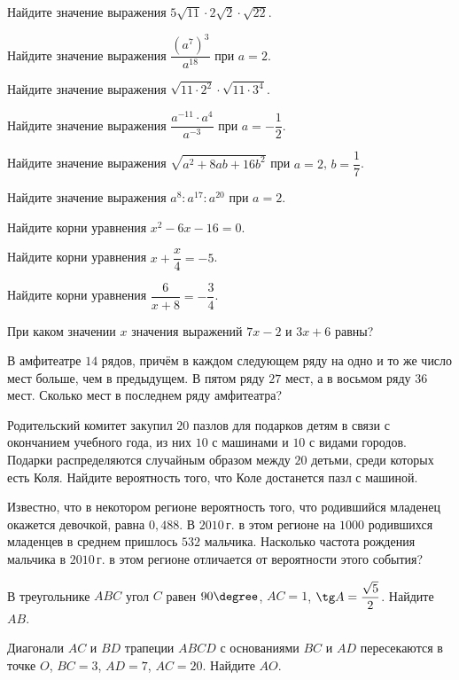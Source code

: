 \begin{class}[number=7]
	\begin{listofex}
		\item  Найдите значение выражения \( 5\sqrt{11}\cdot2\sqrt{2}\cdot\sqrt{22}\).
		\item  Найдите значение выражения \( \dfrac{(a^{7})^{3}}{a^{18}}\) при \( a=2 \).
		\item  Найдите значение выражения \( \sqrt{11\cdot2^{2}}\cdot\sqrt{11\cdot3^{4}}\).
		\item  Найдите значение выражения \( \dfrac{a^{-11}\cdot a^{4}}{a^{-3}}\) при \( a=-\dfrac{1}{2} \).
		\item  Найдите значение выражения \( \sqrt{a^{2}+8ab+16b^{2}}\) при \( a=2 \), \( b=\dfrac{1}{7} \).
		\item  Найдите значение выражения \( a^{8}:a^{17}:a^{20}\) при \( a=2 \).
		\item Найдите корни уравнения \( x^{2} -6x -16=0 \).
		\item Найдите корни уравнения \( x+\dfrac{x}{4}=-5 \).
		\item Найдите корни уравнения \( \dfrac{6}{x+8}=-\dfrac{3}{4} \).
		\item При каком значении \( x \) значения выражений \( 7x-2 \) и \( 3x+6 \) равны?
		\item В амфитеатре \( 14 \) рядов, причём в каждом следующем ряду на одно и то же число мест больше, чем в предыдущем. В пятом ряду \( 27 \) мест, а в восьмом ряду \( 36 \) мест. Сколько мест в последнем ряду амфитеатра?
		\item Родительский комитет закупил \( 20 \) пазлов для подарков детям в связи
		с окончанием учебного года, из них \( 10 \) с машинами и \( 10 \) с видами городов. Подарки распределяются случайным образом между \( 20 \) детьми, среди которых есть Коля. Найдите вероятность того, что Коле достанется пазл
		с машиной.
		\item Известно, что в некотором регионе вероятность того, что родившийся младенец окажется девочкой, равна \( 0,488 \). В \( 2010 \) г. в этом регионе на \( 1000 \) родившихся младенцев в среднем пришлось \( 532  \) мальчика. Насколько частота рождения мальчика в \( 2010 \) г. в этом регионе отличается от вероятности этого события?
		\item В треугольнике \( ABC \) угол \( C \) равен \( 90\degree \), \( AC = 1 \), \( \tg A =  \dfrac{\sqrt{5}}{2}\).  Найдите \( AB \).
		\item Диагонали \( AC \) и \( BD \) трапеции \( ABCD \) с основаниями \( BC \) и \( AD \) пересекаются в точке \( O \), \( BC  =  3 \), \( AD  =  7 \), \( AC  =  20 \). Найдите \( AO \).

\end{listofex}
\end{class}
